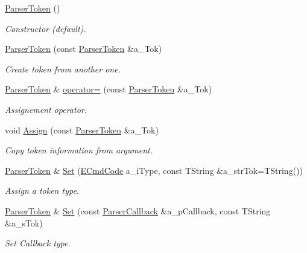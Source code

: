 \begin{DoxyCompactItemize}
\item 
\hyperlink{classmu_1_1_parser_token_a0ce34ca6a1833441e8fd9840b3cde140}{Parser\+Token} ()
\begin{DoxyCompactList}\small\item\em Constructor (default). \end{DoxyCompactList}\item 
\hyperlink{classmu_1_1_parser_token_a17dfc71fe5750f61e9cdd5c2a3355ac0}{Parser\+Token} (const \hyperlink{classmu_1_1_parser_token}{Parser\+Token} \&a\+\_\+\+Tok)
\begin{DoxyCompactList}\small\item\em Create token from another one. \end{DoxyCompactList}\item 
\hyperlink{classmu_1_1_parser_token}{Parser\+Token} \& \hyperlink{classmu_1_1_parser_token_af9abe46bd0a5f2b4cbcc59beba68ca0e}{operator=} (const \hyperlink{classmu_1_1_parser_token}{Parser\+Token} \&a\+\_\+\+Tok)
\begin{DoxyCompactList}\small\item\em Assignement operator. \end{DoxyCompactList}\item 
void \hyperlink{classmu_1_1_parser_token_a40b7e717927c58d03a6665184ff5cc52}{Assign} (const \hyperlink{classmu_1_1_parser_token}{Parser\+Token} \&a\+\_\+\+Tok)
\begin{DoxyCompactList}\small\item\em Copy token information from argument. \end{DoxyCompactList}\item 
\hyperlink{classmu_1_1_parser_token}{Parser\+Token} \& \hyperlink{classmu_1_1_parser_token_ac4588ba38ccc660686956f7998ba74dc}{Set} (\hyperlink{namespacemu_ab77181e591bebd278bf9c7a2e30ad40e}{E\+Cmd\+Code} a\+\_\+i\+Type, const T\+String \&a\+\_\+str\+Tok=T\+String())
\begin{DoxyCompactList}\small\item\em Assign a token type. \end{DoxyCompactList}\item 
\hyperlink{classmu_1_1_parser_token}{Parser\+Token} \& \hyperlink{classmu_1_1_parser_token_aa7c0c0e307b2064f1ab12cbf922c7e40}{Set} (const \hyperlink{classmu_1_1_parser_callback}{Parser\+Callback} \&a\+\_\+p\+Callback, const T\+String \&a\+\_\+s\+Tok)
\begin{DoxyCompactList}\small\item\em Set Callback type. \end{DoxyCompactList}\item 

\end{DoxyCompactItemize}

